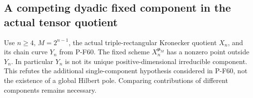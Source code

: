 \subsection{A competing dyadic fixed component in the actual tensor quotient}

\begin{proposition}
\label{prop:tensorcompetingcomponent}
Use $n\ge4$, $M=2^{n-1}$, the actual triple-rectangular
Kronecker quotient $X_n$, and its chain curve $Y_n$ from
P-F60.  The fixed scheme $X_n^{\boldsymbol\mu_M}$ has
a nonzero point outside $Y_n$.  In particular $Y_n$ is
not its unique positive-dimensional irreducible component.
This refutes the additional single-component hypothesis
considered in P-F60, not the existence of a global Hilbert
pole.  Comparing contributions of different components
remains necessary.
\end{proposition}

